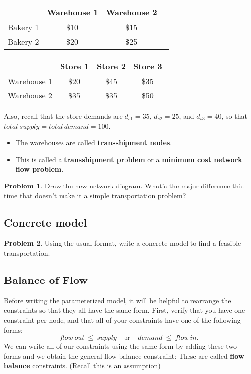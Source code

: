 \documentclass[11pt]{article}
\theoremstyle{definition}
\newtheorem{problem}{Problem}
\begin{document}
\begin{center}
\begin{tabular}{|c|c|c|c|}
\hline
& Warehouse 1 & Warehouse 2 \\
\hline
Bakery 1 & \$10 & \$15 \\
\hline
Bakery 2 & \$20 & \$25 \\
\hline
\end{tabular}
\begin{tabular}{|c|c|c|c|}
\hline
& Store 1 & Store 2 & Store 3 \\
\hline
Warehouse 1 & \$20 & \$45 & \$35 \\
\hline
Warehouse 2 & \$35 & \$35 & \$50 \\
\hline
\end{tabular}
\end{center}
Also, recall that the store demands are $d_{s1} = 35$, $d_{s2} = 25$, and $d_{s3} = 40$, so that $total~supply = total~demand = 100$.
\begin{itemize}
\item The warehouses are called \textbf{transshipment nodes}.   
\item This is called a \textbf{transshipment problem} or a \textbf{minimum cost network flow problem}.
\end{itemize}

\begin{problem}
Draw the new network diagram. What's the major difference this time that doesn't make it a simple transportation problem?
\end{problem} \newpage


\subsection{Concrete model}
\begin{problem}
Using the usual format, write a concrete model to find a feasible transportation.
\end{problem}

\newpage

\subsection{Balance of Flow}

Before writing the parameterized model, it will be helpful to rearrange the constraints so that they all have the same form.  First, verify that you have one constraint per node, and that all of your constraints have one of the following  forms:
\[
flow~out ~\leq~ supply  ~~~~~\text{or}~~~~~  demand ~\leq~ flow~in.
\]
We can write all of our constraints using the same form by adding these two forms and we obtain the general flow balance constraint: \vfill
These are called \textbf{flow balance} constraints.  (Recall this is an assumption)
\end{document}
